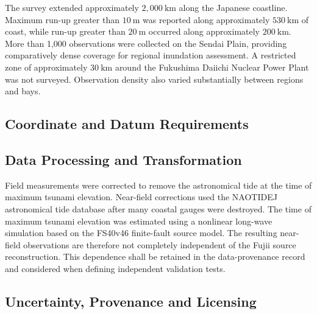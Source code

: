 
The survey extended approximately $2{,}000~\mathrm{km}$ along the Japanese coastline. Maximum run-up greater than $10~\mathrm{m}$ was reported along approximately $530~\mathrm{km}$ of coast, while run-up greater than $20~\mathrm{m}$ occurred along approximately $200~\mathrm{km}$. More than 1,000 observations were collected on the Sendai Plain, providing comparatively dense coverage for regional inundation assessment. A restricted zone of approximately $30~\mathrm{km}$ around the Fukushima Daiichi Nuclear Power Plant was not surveyed. Observation density also varied substantially between regions and bays.

\subsection{Coordinate and Datum Requirements}
\label{sec:res-dat-obs-coordinate-datum-requirements}


\subsection{Data Processing and Transformation}
\label{sec:res-dat-obs-data-processing-transformation}


Field measurements were corrected to remove the astronomical tide at the time of maximum tsunami elevation. Near-field corrections used the NAOTIDEJ astronomical tide database after many coastal gauges were destroyed. The time of maximum tsunami elevation was estimated using a nonlinear long-wave simulation based on the FS40v46 finite-fault source model. The resulting near-field observations are therefore not completely independent of the Fujii source reconstruction. This dependence shall be retained in the data-provenance record and considered when defining independent validation tests.

\subsection{Uncertainty, Provenance and Licensing}
\label{sec:res-dat-obs-uncertainty-provenance-licensing}


